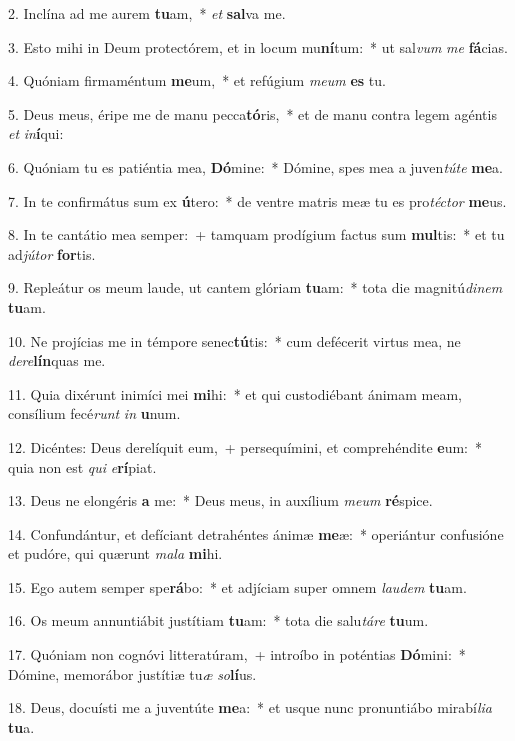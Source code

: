 ﻿2. Inclína ad me aurem \textbf{tu}am,~* \textit{et} \textbf{sal}va me.

3. Esto mihi in Deum protectórem, et in locum mu\textbf{ní}tum:~* ut sal\textit{vum} \textit{me} \textbf{fá}cias.

4. Quóniam firmaméntum \textbf{me}um,~* et refúgium \textit{me}\textit{um} \textbf{es} tu.

5. Deus meus, éripe me de manu pecca\textbf{tó}ris,~* et de manu contra legem agéntis \textit{et} \textit{in}\textbf{í}qui:

6. Quóniam tu es patiéntia mea, \textbf{Dó}mine:~* Dómine, spes mea a juven\textit{tú}\textit{te} \textbf{me}a.

7. In te confirmátus sum ex \textbf{ú}tero:~* de ventre matris meæ tu es pro\textit{téc}\textit{tor} \textbf{me}us.

8. In te cantátio mea semper:~+ tamquam prodígium factus sum \textbf{mul}tis:~* et tu ad\textit{jú}\textit{tor} \textbf{for}tis.

9. Repleátur os meum laude, ut cantem glóriam \textbf{tu}am:~* tota die magnitú\textit{di}\textit{nem} \textbf{tu}am.

10. Ne projícias me in témpore senec\textbf{tú}tis:~* cum defécerit virtus mea, ne \textit{de}\textit{re}\textbf{lín}quas me.

11. Quia dixérunt inimíci mei \textbf{mi}hi:~* et qui custodiébant ánimam meam, consílium fecé\textit{runt} \textit{in} \textbf{u}num.

12. Dicéntes: Deus derelíquit eum,~+ persequímini, et comprehéndite \textbf{e}um:~* quia non est \textit{qui} \textit{e}\textbf{rí}piat.

13. Deus ne elongéris \textbf{a} me:~* Deus meus, in auxílium \textit{me}\textit{um} \textbf{ré}spice.

14. Confundántur, et defíciant detrahéntes ánimæ \textbf{me}æ:~* operiántur confusióne et pudóre, qui quærunt \textit{ma}\textit{la} \textbf{mi}hi.

15. Ego autem semper spe\textbf{rá}bo:~* et adjíciam super omnem \textit{lau}\textit{dem} \textbf{tu}am.

16. Os meum annuntiábit justítiam \textbf{tu}am:~* tota die salu\textit{tá}\textit{re} \textbf{tu}um.

17. Quóniam non cognóvi litteratúram,~+ introíbo in poténtias \textbf{Dó}mini:~* Dómine, memorábor justítiæ tu\textit{æ} \textit{so}\textbf{lí}us.

18. Deus, docuísti me a juventúte \textbf{me}a:~* et usque nunc pronuntiábo mirabí\textit{li}\textit{a} \textbf{tu}a.

